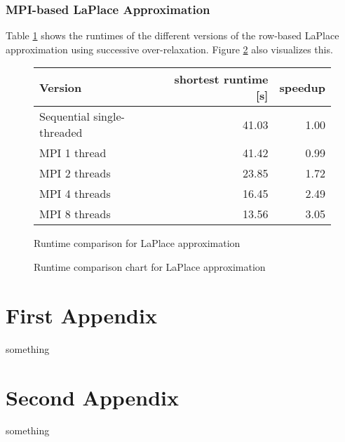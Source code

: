 \documentclass[]{article}
\begin{document}
\subsection{MPI-based LaPlace Approximation}

 Table \ref{tab:laplace-sor-runtime} shows the runtimes of the different versions of the row-based LaPlace approximation using successive over-relaxation. Figure \ref{fig:laplace-sor-chart} also visualizes this.

\begin{figure}[h]
	\centering
	\begin{tabular}{|l|r|r|}
		\hline
		\textbf{Version} & \textbf{shortest runtime [s]} & \textbf{speedup} \\
		\hline
		Sequential single-threaded	& 41.03 & 1.00 \\ 
		\hline 
		MPI 1 thread				& 41.42 & 0.99 \\ 
		\hline 
		MPI 2 threads				& 23.85 & 1.72 \\ 
		\hline 
		MPI 4 threads 				& 16.45 & 2.49 \\ 
		\hline 
		MPI 8 threads				& 13.56 & 3.05 \\ 
		\hline 
	\end{tabular} 
	\caption{Runtime comparison for LaPlace approximation}
	\label{tab:laplace-sor-runtime}
\end{figure}

\begin{figure}[h]
	\centering
	\caption{Runtime comparison chart for LaPlace approximation}
	\label{fig:laplace-sor-chart}
\end{figure}

\begin{appendices}
	\chapter{First Appendix}
	something
	\chapter{Second Appendix}
	something
\end{appendices}
\end{document}

